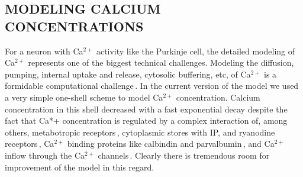 \documentclass[12pt]{article}
\begin{document}
\subsection*{MODELING CALCIUM CONCENTRATIONS}

For a neuron with
Ca$^{2+}$ activity like the Purkinje cell, the detailed modeling of
Ca$^{2+}$ represents one of the biggest technical challenges.
Modeling the diffusion, pumping, internal uptake and release,
cytosolic buffering, etc, of Ca$^{2+}$ is a formidable computational
challenge\,\cite{Sala:1990ys, Yamada-W:1989bs}. 
In the current version of the model we
used a very simple one-shell scheme to model Ca$^{2+}$ concentration.
Calcium concentration in this shell decreased with
a fast exponential decay despite the fact that Ca*+ concentration
is regulated by a complex interaction of, among
others, metabotropic receptors\,\cite{Llano:1991kx, Staub:1992zr}, 
cytoplasmic stores with IP, and ryanodine receptors\,\cite{Takei:1992ac}, 
Ca$^{2+}$ binding proteins like calbindin
and parvalbumin\,\cite{Kadowaki:1993ly}, and Ca$^{2+}$
inflow through the Ca$^{2+}$ channels\,\cite{Hockberger:1989ve, Lev-Ram:1992vn, Ross:339qf}. 
Clearly there is tremendous room for improvement of the model in this
regard.
\end{document}
